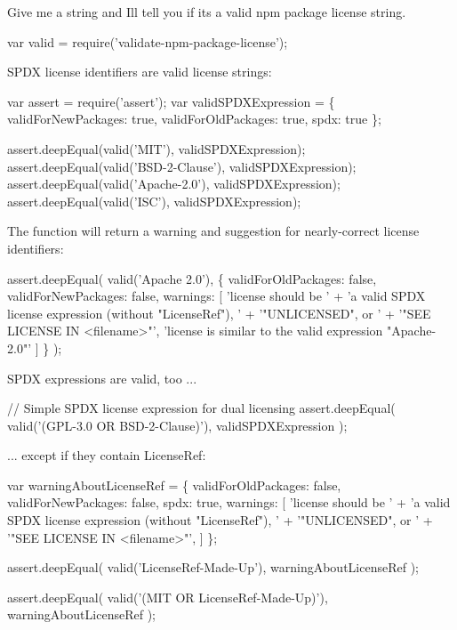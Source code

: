 Give me a string and I\textquotesingle{}ll tell you if it\textquotesingle{}s a valid npm package license string.


\begin{DoxyCode}
var valid = require('validate-npm-package-license');
\end{DoxyCode}


S\+P\+DX license identifiers are valid license strings\+:


\begin{DoxyCode}
var assert = require('assert');
var validSPDXExpression = \{
  validForNewPackages: true,
  validForOldPackages: true,
  spdx: true
\};

assert.deepEqual(valid('MIT'), validSPDXExpression);
assert.deepEqual(valid('BSD-2-Clause'), validSPDXExpression);
assert.deepEqual(valid('Apache-2.0'), validSPDXExpression);
assert.deepEqual(valid('ISC'), validSPDXExpression);
\end{DoxyCode}
 The function will return a warning and suggestion for nearly-\/correct license identifiers\+:


\begin{DoxyCode}
assert.deepEqual(
  valid('Apache 2.0'),
  \{
    validForOldPackages: false,
    validForNewPackages: false,
    warnings: [
      'license should be ' +
      'a valid SPDX license expression (without "LicenseRef"), ' +
      '"UNLICENSED", or ' +
      '"SEE LICENSE IN <filename>"',
      'license is similar to the valid expression "Apache-2.0"'
    ]
  \}
);
\end{DoxyCode}


S\+P\+DX expressions are valid, too ...


\begin{DoxyCode}
// Simple SPDX license expression for dual licensing
assert.deepEqual(
  valid('(GPL-3.0 OR BSD-2-Clause)'),
  validSPDXExpression
);
\end{DoxyCode}


... except if they contain {\ttfamily License\+Ref}\+:


\begin{DoxyCode}
var warningAboutLicenseRef = \{
  validForOldPackages: false,
  validForNewPackages: false,
  spdx: true,
  warnings: [
    'license should be ' +
    'a valid SPDX license expression (without "LicenseRef"), ' +
    '"UNLICENSED", or ' +
    '"SEE LICENSE IN <filename>"',
  ]
\};

assert.deepEqual(
  valid('LicenseRef-Made-Up'),
  warningAboutLicenseRef
);

assert.deepEqual(
  valid('(MIT OR LicenseRef-Made-Up)'),
  warningAboutLicenseRef
);
\end{DoxyCode}


